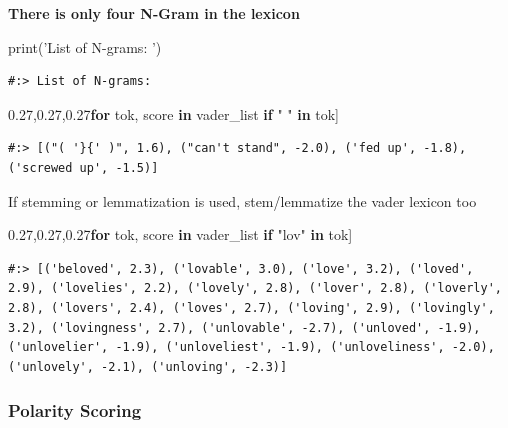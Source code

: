 \documentclass[
]{book}
\newenvironment{Shaded}{\begin{snugshade}}{\end{snugshade}}
\newcommand{\BuiltInTok}[1]{#1}
\newcommand{\ControlFlowTok}[1]{\textcolor[rgb]{0.27,0.27,0.27}{\textbf{#1}}}
\newcommand{\KeywordTok}[1]{\textcolor[rgb]{0.27,0.27,0.27}{\textbf{#1}}}
\newcommand{\NormalTok}[1]{#1}
\newcommand{\StringTok}[1]{\textcolor[rgb]{0.5,0.5,0.5}{#1}}
\begin{document}
\textbf{There is only four N-Gram in the lexicon}

\begin{Shaded}
\begin{Highlighting}[]
\BuiltInTok{print}\NormalTok{(}\StringTok{'List of N-grams: '}\NormalTok{)}
\end{Highlighting}
\end{Shaded}

\begin{verbatim}
#:> List of N-grams:
\end{verbatim}

\begin{Shaded}
\begin{Highlighting}[]
\NormalTok{[ (tok,score) }\ControlFlowTok{for}\NormalTok{ tok, score }\KeywordTok{in}\NormalTok{ vader_list }\ControlFlowTok{if} \StringTok{" "} \KeywordTok{in}\NormalTok{ tok]}
\end{Highlighting}
\end{Shaded}

\begin{verbatim}
#:> [("( '}{' )", 1.6), ("can't stand", -2.0), ('fed up', -1.8), ('screwed up', -1.5)]
\end{verbatim}

If stemming or lemmatization is used, stem/lemmatize the vader lexicon too

\begin{Shaded}
\begin{Highlighting}[]
\NormalTok{[ (tok,score) }\ControlFlowTok{for}\NormalTok{ tok, score }\KeywordTok{in}\NormalTok{ vader_list }\ControlFlowTok{if} \StringTok{"lov"} \KeywordTok{in}\NormalTok{ tok]}
\end{Highlighting}
\end{Shaded}

\begin{verbatim}
#:> [('beloved', 2.3), ('lovable', 3.0), ('love', 3.2), ('loved', 2.9), ('lovelies', 2.2), ('lovely', 2.8), ('lover', 2.8), ('loverly', 2.8), ('lovers', 2.4), ('loves', 2.7), ('loving', 2.9), ('lovingly', 3.2), ('lovingness', 2.7), ('unlovable', -2.7), ('unloved', -1.9), ('unlovelier', -1.9), ('unloveliest', -1.9), ('unloveliness', -2.0), ('unlovely', -2.1), ('unloving', -2.3)]
\end{verbatim}

\hypertarget{polarity-scoring}{%
\subsubsection{Polarity Scoring}\label{polarity-scoring}}
\end{document}
